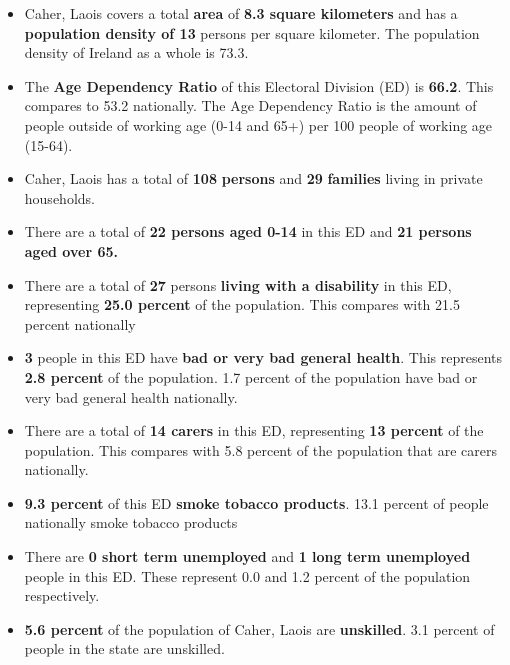 \documentclass{article}
\begin{document}
\begin{itemize}

\item Caher, Laois covers a total \textbf{area} of  \textbf{8.3 square kilometers} and has a \textbf{population density of 13} persons per square kilometer. The population density of Ireland as a whole is  73.3. 

\item The \textbf{Age Dependency Ratio} of this Electoral Division (ED) is  \textbf{66.2}. This compares to 53.2 nationally. The Age Dependency Ratio is the amount of people outside of working age (0-14 and 65+) per 100 people of working age (15-64). 

\item Caher, Laois has a total of \textbf{108} \textbf{persons} and  \textbf{29} \textbf{families} living in private households.

\item There are a total of \textbf{22 persons aged 0-14} in this ED and \textbf{21 persons aged over 65.} 

\item There are a total of \textbf{27} persons \textbf{living with a disability} in this ED, representing \textbf{25.0 percent} of the population. This compares with  21.5 percent nationally

\item \textbf{3} people in this ED have \textbf{bad or very bad general health}. This represents \textbf{2.8 percent} of the population. 1.7 percent of the population have bad or very bad general health nationally. 

\item There are a total of \textbf{14 carers} in this ED, representing \textbf{13 percent} of the population. This compares with 5.8 percent of the population that are carers nationally. 

\item \textbf{9.3 percent} of this ED \textbf{smoke tobacco products}. 13.1 percent of people nationally smoke tobacco products

\item There are \textbf{0 short term unemployed} and \textbf{1 long term unemployed} people in this ED. These represent 0.0 and 1.2 percent of the population respectively.

\item  \textbf{5.6 percent} of the population of Caher, Laois are \textbf{unskilled}. 3.1 percent of people in the state are unskilled.


\end{itemize}
\end{document}

